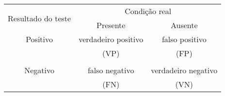 \begin{tabular}{ccc}
    \toprule
    \multirow{2}{2cm}{Resultado do teste} &
    \multicolumn{2}{c}{Condição real} \\
    \cmidrule{2-3}
    & Presente & Ausente \\ 
    \midrule
    Positivo & verdadeiro positivo  & falso positivo \\
    & (VP) & (FP)\\
    \\
    Negativo & falso negativo & verdadeiro negativo \\
    & (FN) & (VN)\\
    \bottomrule
\end{tabular}